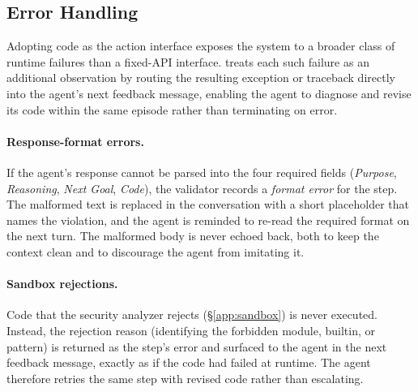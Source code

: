 \subsection{Error Handling}
\label{app:error_handling}
Adopting code as the action interface exposes the system to a broader class of runtime failures than a fixed-API interface. \ours{} treats each such failure as an additional observation by routing the resulting exception or traceback directly into the agent's next feedback message, enabling the agent to diagnose and revise its code within the same episode rather than terminating on error.

\paragraph{Response-format errors.}
If the agent's response cannot be parsed into the four required fields (\emph{Purpose}, \emph{Reasoning}, \emph{Next Goal}, \emph{Code}), the validator records a \emph{format error} for the step. The malformed text is replaced in the conversation with a short placeholder that names the violation, and the agent is reminded to re-read the required format on the next turn. The malformed body is never echoed back, both to keep the context clean and to discourage the agent from imitating it.

\paragraph{Sandbox rejections.}
Code that the security analyzer rejects (\S\ref{app:sandbox}) is never executed. Instead, the rejection reason (identifying the forbidden module, builtin, or pattern) is returned as the step's error and surfaced to the agent in the next feedback message, exactly as if the code had failed at runtime. The agent therefore retries the same step with revised code rather than escalating.

